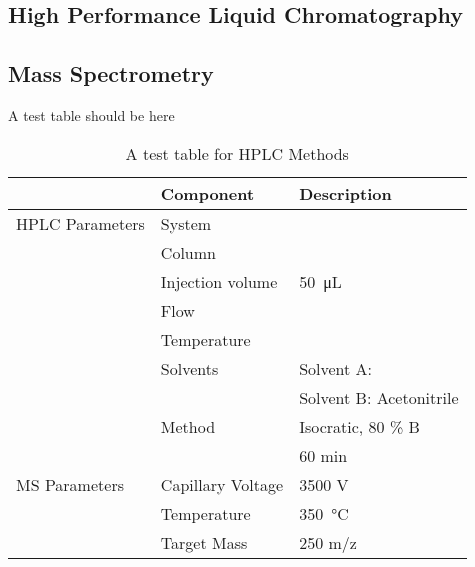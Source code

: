 	\subsection{High Performance Liquid Chromatography} %
	\label{sub:hplc}

	\subsection{Mass Spectrometry} %
	\label{sub:mass_spectrometry}

A test table should be here

\begin{table}[h]
	\caption{A test table for HPLC Methods}
	\label{tab:asddf}
	\centering
	\begin{tabularx}{\textwidth}{XXX}
						& \textbf{Component}		& \textbf{Description}	\\
		\midrule
		HPLC Parameters & System			& 	\\
						& Column			& 	\\
						& Injection volume 	& \SI{50}{\micro\liter}	\\
						& Flow				& 	\\
						& Temperature		& 	\\
						& Solvents			& Solvent A: \ch{H2O}	\\
						& 					& Solvent B: Acetonitrile	\\
						& Method			& Isocratic, 80 \% B \\
						&					& 60 min \\
		MS Parameters	& Capillary Voltage	& 3500 V\\
						& Temperature		& \SI{350}{\celsius}	\\
						& Target Mass		& 250 m/z \\
		\bottomrule
	\end{tabularx}
\end{table}

